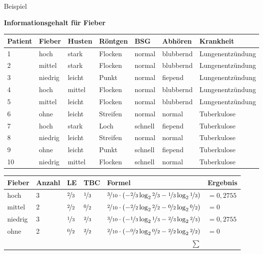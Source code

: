 \begin{frame}{Beispiel}

\textbf{Informationsgehalt für Fieber}\\[1em]

\begin{tabular}{|l l l l l l | l |}\hline
\textbf{Patient} & \textbf{\textcolor{ohmred}{Fieber}} & \textbf{\textcolor{ohmred}{Husten}} & \textbf{\textcolor{ohmred}{Röntgen}} & \textbf{\textcolor{ohmred}{BSG}} & \textbf{\textcolor{ohmred}{Abhören}} &\textbf{\textcolor{ohmgreen}{Krankheit}}\\ \hline
1 & hoch & stark & Flocken & normal & blubbernd & Lungenentzündung \\
2 & mittel & stark & Flocken & normal & blubbernd & Lungenentzündung \\
3 & niedrig & leicht & Punkt & normal & fiepend & Lungenentzündung \\
4 & hoch & mittel & Flocken & normal & blubbernd & Lungenentzündung \\
5 & mittel & leicht & Flocken & normal & blubbernd & Lungenentzündung \\
6 & ohne & leicht & Streifen & normal & normal & Tuberkulose \\
7 & hoch & stark & Loch & schnell & fiepend & Tuberkulose \\
8 & niedrig & leicht & Streifen & normal & normal & Tuberkulose \\
9 & ohne & leicht & Punkt & schnell & fiepend & Tuberkulose \\
10 & niedrig & mittel & Flocken & schnell & normal & Tuberkulose \\ \hline 
\end{tabular}

\vfill

\begin{tabular}{| l<{\onslide<2->} | l<{\onslide<3->} | l<{\onslide<5->} | l<{\onslide<6->} | l<{\onslide<7->} | l<{\onslide} |}\hline 
\textbf{\textcolor{ohmred}{Fieber}} & \textbf{Anzahl} & \textbf{LE} & \textbf{TBC} & \textbf{Formel} & \textbf{Ergebnis} \\ \hline
hoch & 3 & $ \nicefrac{2}{3}$ & $ \nicefrac{1}{3}$ & $ \nicefrac{3}{10} \cdot \left(- \nicefrac{2}{3} \log_2 \nicefrac{2}{3} - \nicefrac{1}{3} \log_2 \nicefrac{1}{3} \right)$ & $=0{,}2755$\\ \hline
mittel & 2 & $ \nicefrac{2}{2}$ & $\nicefrac{0}{2}$ & $ \nicefrac{2}{10} \cdot \left(- \nicefrac{2}{2} \log_2 \nicefrac{2}{2} - \nicefrac{0}{2} \log_2 \nicefrac{0}{2} \right)$ & $=0$\\ \hline
niedrig & 3 & $\nicefrac{1}{3}$ & $\nicefrac{2}{3}$ & $\nicefrac{3}{10} \cdot \left(- \nicefrac{1}{3} \log_2 \nicefrac{1}{3} - \nicefrac{2}{3} \log_2 \nicefrac{2}{3} \right)$ & $=0{,}2755$\\ \hline
ohne & 2 & $\nicefrac{0}{2}$ & $\nicefrac{2}{2}$ & $\nicefrac{2}{10} \cdot \left(- \nicefrac{0}{2} \log_2 \nicefrac{0}{2} - \nicefrac{2}{2} \log_2 \nicefrac{2}{2} \right)$ & $=0$\\ \hline
\multicolumn{5}{r|}{$\boldsymbol{\sum}$} & \onslide<8->{$0{,}5510$} \\ \cline{6-6}
\end{tabular}



\end{frame}
